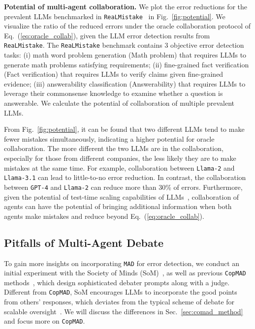 \documentclass{article} %
\newcommand{\yq}[1]{\textcolor{darkred}{#1}}
\newcommand{\copmad}[0]{\texttt{CopMAD}\xspace}
\newcommand{\mad}[0]{\texttt{MAD}\xspace}
\newcommand{\real}[0]{\texttt{ReaLMistake}\xspace}
\begin{document}
\textbf{Potential of multi-agent collaboration.} We plot the error reductions for the prevalent LLMs benchmarked in \real~\citep{realmistake} in Fig.~\ref{fig:potential}. We visualize the ratio of the reduced errors under the oracle collaboration protocol of Eq.~(\ref{eq:oracle_collab}),  given the LLM error detection results from \real.
The \real benchmark contains $3$ objective error detection tasks: (i) math word problem generation (Math problem) that requires LLMs to generate math problems satisfying requirements; (ii) fine-grained fact verification (Fact verification) that requires LLMs to verify claims given fine-grained evidence; (iii) answerability classification (Answerability) that requires LLMs to leverage their commonsense knowledge to examine whether a question is answerable. We calculate the potential of collaboration of multiple prevalent LLMs.

From Fig.~\ref{fig:potential}, it can be found that two different LLMs tend to make fewer mistakes simultaneously, indicating a higher potential for oracle collaboration. The more different the two LLMs are in the collaboration, especially for those from different companies, the less likely they are to make mistakes at the same time. For example, collaboration between \texttt{Llama-2} and \texttt{Llama-3.1} can lead to little-to-no error reduction. In contrast, the collaboration between \texttt{GPT-4} and \texttt{Llama-2} can reduce more than 30\% of errors.
%
Furthermore, given the potential of test-time scaling capabilities of LLMs~\citep{TTT_better,muennighoff2025s1simpletesttimescaling}, collaboration of agents can have the potential of bringing additional information when both agents make mistakes and reduce beyond Eq.~(\ref{eq:oracle_collab}).



\subsection{Pitfalls of Multi-Agent Debate}
\label{sec:mad_pitfall}
To gain more insights on incorporating \mad for error detection, we conduct an initial experiment with the Society of Minds (SoM)~\citep{du2023improving}, as well as previous \copmad methods~\citep{khan2024debating,kenton2024on}, which design sophisticated debater prompts along with a judge. Different from \copmad, SoM encourages LLMs to incorporate the good points from others' responses, which deviates from the typical scheme of debate for scalable oversight~\citep{irving2018ai,khan2024debating,kenton2024on}. We will discuss the differences in Sec.~\ref{sec:comad_method} and focus more on \copmad.
\end{document}
